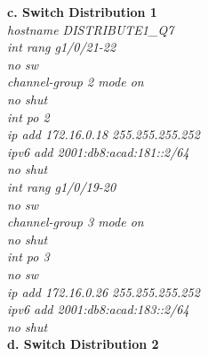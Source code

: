 \documentclass[a4paper, 12pt]{article}
\begin{document}
\hspace*{1cm}\textbf{c. Switch Distribution 1}\\
\hspace*{2cm}\textit{hostname DISTRIBUTE1\_Q7\\
\hspace*{2cm}int rang g1/0/21-22\\
\hspace*{2cm}no sw\\
\hspace*{2cm}channel-group 2 mode on\\
\hspace*{2cm}no shut\\
\hspace*{2cm}int po 2\\
\hspace*{2cm}ip add 172.16.0.18 255.255.255.252\\
\hspace*{2cm}ipv6 add 2001:db8:acad:181::2/64\\
\hspace*{2cm}no shut\\
\hspace*{2cm}int rang g1/0/19-20\\
\hspace*{2cm}no sw\\
\hspace*{2cm}channel-group 3 mode on\\
\hspace*{2cm}no shut\\
\hspace*{2cm}int po 3\\
\hspace*{2cm}no sw\\
\hspace*{2cm}ip add 172.16.0.26 255.255.255.252\\
\hspace*{2cm}ipv6 add 2001:db8:acad:183::2/64\\
\hspace*{2cm}no shut\\}
\hspace*{1cm}\textbf{d. Switch Distribution 2}\\
\end{document}
